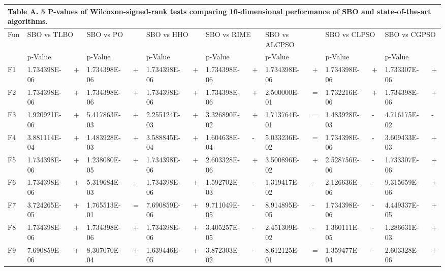 \documentclass{article} %
\begin{document}
\begin{tabular}{|p{0.3in}|p{0.5in}|p{0.1in}|p{0.5in}|p{0.1in}|p{0.5in}|p{0.1in}|p{0.5in}|p{0.1in}|p{0.5in}|p{0.2in}|p{0.5in}|p{0.1in}|p{0.5in}|p{0.1in}|} \hline 
\multicolumn{15}{|p{1in}|}{\textbf{Table A. }5\textbf{ }P-values of Wilcoxon-signed-rank tests comparing 10-dimensional performance of SBO and state-of-the-art algorithms.\textbf{}} \\ \hline 
Fun & \multicolumn{2}{|p{0.7in}|}{SBO vs TLBO} & \multicolumn{2}{|p{0.7in}|}{SBO vs PO} & \multicolumn{2}{|p{0.7in}|}{SBO vs HHO} & \multicolumn{2}{|p{0.7in}|}{SBO vs RIME} & \multicolumn{2}{|p{0.7in}|}{SBO vs ALCPSO} & \multicolumn{2}{|p{0.7in}|}{SBO vs CLPSO} & \multicolumn{2}{|p{0.7in}|}{SBO vs CGPSO} \\ \hline 
 & p-Value &  & p-Value &  & p-Value &  & p-Value &  & p-Value &  & p-Value &  & p-Value &  \\ \hline 
F1 & 1.734398E-06 & + & 1.734398E-06 & + & 1.734398E-06 & + & 1.734398E-06 & + & 1.734398E-06 & + & 1.734398E-06 & + & 1.733307E-06 & + \\ \hline 
F2 & 1.734398E-06 & + & 1.734398E-06 & + & 1.734398E-06 & + & 1.734398E-06 & + & 2.500000E-01 & = & 1.732216E-06 & + & 1.734398E-06 & + \\ \hline 
F3 & 1.920921E-06 & + & 5.417863E-03 & + & 2.255124E-03 & + & 3.326890E-02 & + & 1.713764E-01 & = & 1.483928E-03 & - & 4.716175E-02 & - \\ \hline 
F4 & 3.881114E-04 & + & 1.483928E-03 & + & 3.588845E-04 & + & 1.604638E-04 & - & 5.033236E-02 & = & 1.734398E-06 & - & 3.609433E-03 & + \\ \hline 
F5 & 1.734398E-06 & + & 1.238080E-05 & + & 1.734398E-06 & + & 2.603328E-06 & + & 3.500896E-02 & + & 2.528756E-06 & - & 1.733307E-06 & + \\ \hline 
F6 & 1.734398E-06 & + & 5.319684E-03 & - & 1.734398E-06 & + & 1.592702E-03 & - & 1.319417E-02 & - & 2.126636E-06 & - & 9.315659E-06 & + \\ \hline 
F7 & 3.724265E-05 & + & 1.765513E-01 & = & 7.690859E-06 & + & 9.711049E-05 & - & 8.914895E-05 & - & 1.734398E-06 & - & 4.449337E-05 & + \\ \hline 
F8 & 1.734398E-06 & + & 1.734398E-06 & + & 1.734398E-06 & + & 3.405257E-05 & - & 2.451309E-02 & - & 1.360111E-05 & - & 1.286631E-03 & + \\ \hline 
F9 & 7.690859E-06 & + & 8.307070E-04 & + & 1.639446E-05 & + & 3.872303E-02 & - & 8.612125E-01 & = & 1.359477E-04 & - & 2.603328E-06 & + \\ \hline 

\end{tabular}
\end{document}
